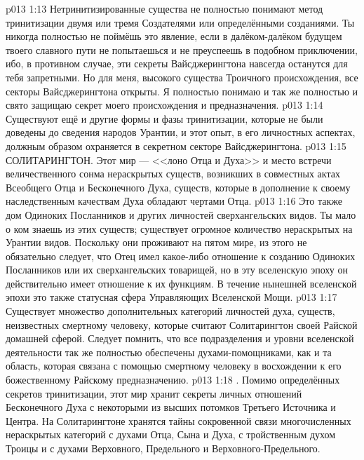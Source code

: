 \vs p013 1:13 Нетринитизированные существа не полностью понимают метод тринитизации двумя или тремя Создателями или определёнными созданиями. Ты никогда полностью не поймёшь это явление, если в далёком\hyp{}далёком будущем твоего славного пути не попытаешься и не преуспеешь в подобном приключении, ибо, в противном случае, эти секреты Вайсджерингтона навсегда останутся для тебя запретными. Но для меня, высокого существа Троичного происхождения, все секторы Вайсджерингтона открыты. Я полностью понимаю и так же полностью и свято защищаю секрет моего происхождения и предназначения.
\vs p013 1:14 Существуют ещё и другие формы и фазы тринитизации, которые не были доведены до сведения народов Урантии, и этот опыт, в его личностных аспектах, должным образом охраняется в секретном секторе Вайсджерингтона.
\vs p013 1:15 СОЛИТАРИНГТОН. Этот мир --- <<лоно Отца и Духа>> и место встречи величественного сонма нераскрытых существ, возникших в совместных актах Всеобщего Отца и Бесконечного Духа, существ, которые в дополнение к своему наследственным качествам Духа обладают чертами Отца.
\vs p013 1:16 Это также дом Одиноких Посланников и других личностей сверхангельских видов. Ты мало о ком знаешь из этих существ; существует огромное количество нераскрытых на Урантии видов. Поскольку они проживают на пятом мире, из этого не обязательно следует, что Отец имел какое\hyp{}либо отношение к созданию Одиноких Посланников или их сверхангельских товарищей, но в эту вселенскую эпоху он действительно имеет отношение к их функциям. В течение нынешней вселенской эпохи это также статусная сфера Управляющих Вселенской Мощи.
\vs p013 1:17 Существует множество дополнительных категорий личностей духа, существ, неизвестных смертному человеку, которые считают Солитарингтон своей Райской домашней сферой. Следует помнить, что все подразделения и уровни вселенской деятельности так же полностью обеспечены духами\hyp{}помощниками, как и та область, которая связана с помощью смертному человеку в восхождении к его божественному Райскому предназначению.
\vs p013 1:18 \pc {}. Помимо определённых секретов тринитизации, этот мир хранит секреты личных отношений Бесконечного Духа с некоторыми из высших потомков Третьего Источника и Центра. На Солитарингтоне хранятся тайны сокровенной связи многочисленных нераскрытых категорий с духами Отца, Сына и Духа, с тройственным духом Троицы и с духами Верховного, Предельного и Верховного\hyp{}Предельного.
